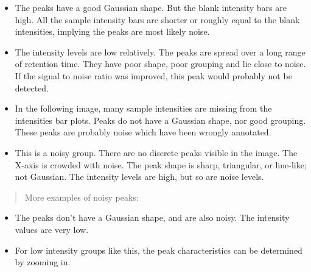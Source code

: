\documentclass[letterpaper,10pt,english,openany,oneside]{sphinxmanual}
\begin{document}
\begin{itemize}
\item {} 
The peaks have a good Gaussian shape. But the blank intensity bars are high. All the sample intensity bars are shorter or roughly equal to the blank intensities, implying the peaks are most likely noise.

\end{itemize}

\begin{itemize}
\item {} 
The intensity levels are low relatively. The peaks are spread over a long range of retention time. They have poor shape, poor grouping and lie close to noise. If the signal to noise ratio was improved, this peak would probably not be detected.

\end{itemize}

\begin{itemize}
\item {} 
In the following image, many sample intensities are missing from the intensities bar plots. Peaks do not have a Gaussian shape, nor good grouping. These peaks are probably noise which have been wrongly annotated.

\end{itemize}

\begin{itemize}
\item {} 
This is a noisy group. There are no discrete peaks visible in the image. The X-axis is crowded with noise. The peak shape is sharp, triangular, or line-like; not Gaussian. The intensity levels are high, but so are noise levels.

\end{itemize}

\begin{quote}

More examples of noisy peaks:
\end{quote}


\begin{itemize}
\item {} 
The peaks don’t have a Gaussian shape, and are also noisy. The intensity values are very low.

\item {} 
For low intensity groups like this, the peak characteristics can be determined by zooming in.

\end{itemize}
\end{document}
